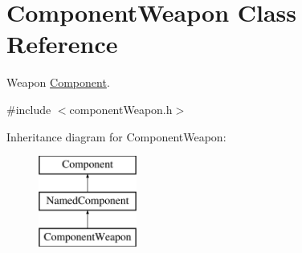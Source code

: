 \hypertarget{classComponentWeapon}{
\section{\-Component\-Weapon \-Class \-Reference}
\label{de/df8/classComponentWeapon}
}


\-Weapon \hyperlink{classComponent}{\-Component}.  




{\ttfamily \#include $<$component\-Weapon.\-h$>$}

\-Inheritance diagram for \-Component\-Weapon\-:\begin{figure}[H]
\begin{center}
\leavevmode
\includegraphics[height=3.000000cm]{de/df8/classComponentWeapon}
\end{center}
\end{figure}
